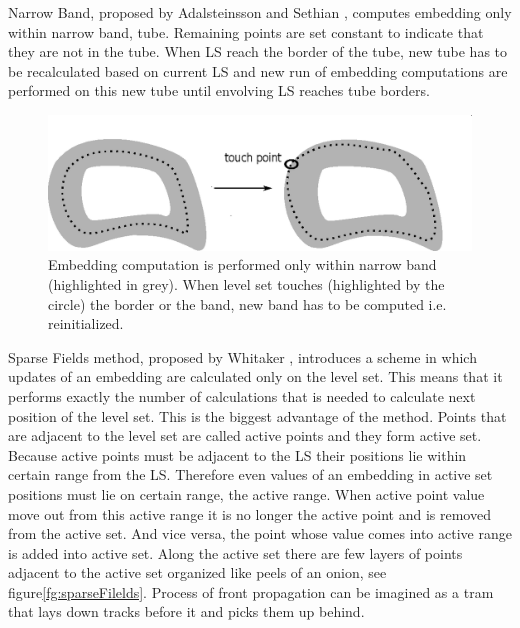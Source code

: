 Narrow Band, proposed by Adalsteinsson and Sethian \cite{sethianFastLS}, computes embedding only within narrow band, tube.
Remaining points are set constant to indicate that they are not in the tube.
When LS reach the border of the tube, new tube has to be recalculated based on current LS and new run of embedding computations are performed on this new tube until envolving LS reaches tube borders.

\begin{figure}
    \centering
    \includegraphics[width=\textwidth]{data/narrowBands}
    \caption[Narrow band computation illustration]{Embedding computation is performed only within narrow band (highlighted in grey). When level set touches (highlighted by the circle) the border or the band, new band has to be computed i.e. reinitialized.}
    \label{fg:narrowBands}
\end{figure}

\par
Sparse Fields method, proposed by Whitaker \cite{sparseFilelds}, introduces a scheme in which updates of an embedding are calculated only on the level set.
This means that it performs exactly the number of calculations that is needed to calculate next position of the level set.
This is the biggest advantage of the method. Points that are adjacent to the level set are called active points and they form active set.
Because active points must be adjacent to the LS their positions lie within certain range from the LS.
Therefore even values of an embedding in active set positions must lie on certain range, the active range.
When active point value move out from this active range it is no longer the active point and is removed from the active set.
And vice versa, the point whose value comes into active range is added into active set.
Along the active set there are few layers of points adjacent to the active set organized like peels of an onion, see figure\ref{fg:sparseFilelds}.
Process of front propagation can be imagined as a tram that lays down tracks before it and picks them up behind.

